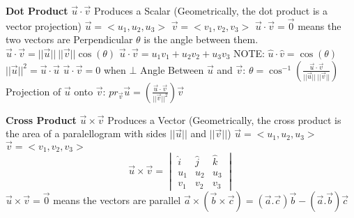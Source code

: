 \documentclass[10pt,a4paper,landscape]{article}
\begin{document}
\begin{multicols*}{5}
	\textbf{Dot Product}\newline
	$ \vec{u} \cdot \vec{v} $\newline
	Produces a Scalar \newline
	(Geometrically, the dot product is a vector projection)\newline
	$\vec{u} = < u_1, u_2, u_3 >$\newline
	$\vec{v} = < v_1, v_2, v_3 >$\newline
	$ \vec{u} \cdot \vec{v} = \vec{0} $ means the two vectors are Perpendicular
	$ \theta $ is the angle between them.\newline
	$\vec{u} \cdot \vec{v} = ||\vec{u}||\:||\vec{v}||\cos(\theta) $\newline
	$\vec{u} \cdot \vec{v} = u_1v_1 + u_2v_2 + u_3v_3 $\newline
	NOTE:\newline
	$ \hat{u} \cdot \hat{v} = \cos(\theta) $\newline
	$ ||\vec{u}||^2 = \vec{u} \cdot \vec{u} $\newline
	$ \vec{u} \cdot \vec{v} = 0 $ when $ \bot $\newline
	Angle Between $ \vec{u} $ and $ \vec{v} $:\newline
	$ \theta = \cos^{-1}(\frac{\vec{u} \cdot \vec{v}}{||\vec{u}||\:||\vec{v}||}) $\newline
	Projection of $ \vec{u} $ onto $ \vec{v} $:\newline
	$ pr_{\vec{v}}\vec{u} = (\frac{\vec{u} \cdot \vec{v}}{||\vec{v}||^2})\vec{v} $\newline

	\textbf{Cross Product}\newline
	$\vec{u} \times \vec{v}$\newline
	Produces a Vector\newline
	(Geometrically, the cross product is the area of a paralellogram with sides $ ||\vec{u}|| $ and $ ||\vec{v}|| $)\newline
	$\vec{u} = < u_1, u_2, u_3 >$\newline
	$\vec{v} = < v_1, v_2, v_3 >$\newline
	\[
		\vec{u} \times \vec{v} = 
		\begin{vmatrix}
			\hat{i} & \hat{j} & \hat{k} \\
			u_1 & u_2 & u_3 \\
			v_1 & v_2 & v_3
		\end{vmatrix}
	\]\newline 
	$ \vec{u} \times \vec{v} = \vec{0} $ means the vectors are parallel \newline
	$ \vec{ a } \times ( \vec{ b } \times \vec{ c } )= ( \vec{ a } . \vec{ c } ) \vec{ b } - ( \vec{ a } . \vec{ b } ) \vec{ c }$ \newline


\end{multicols*}
\end{document}
